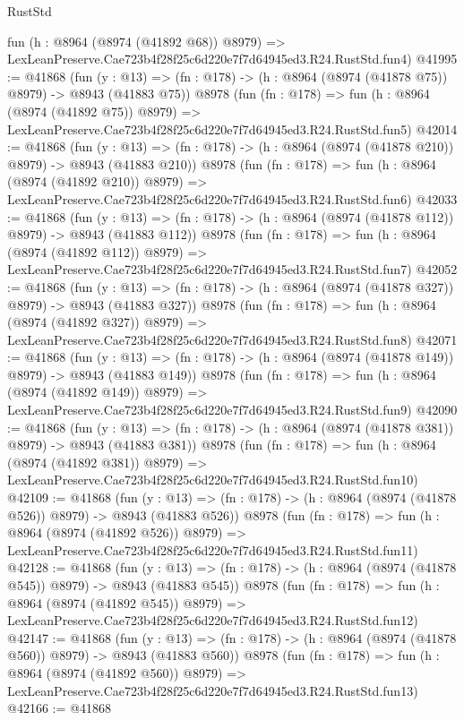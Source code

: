 \begin{lexlean}{RustStd}
\begin{coremodule}
    fun (h : @8964 (@8974 (@41892 @68)) @8979) =>
    LexLeanPreserve.Cae723b4f28f25c6d220e7f7d64945ed3.R24.RustStd.fun4)
@41995 := @41868
    (fun (y : @13) => (fn : @178) -> (h : @8964 (@8974 (@41878 @75)) @8979) -> @8943 (@41883 @75))
    @8978
    (fun (fn : @178) =>
    fun (h : @8964 (@8974 (@41892 @75)) @8979) =>
    LexLeanPreserve.Cae723b4f28f25c6d220e7f7d64945ed3.R24.RustStd.fun5)
@42014 := @41868
    (fun (y : @13) => (fn : @178) -> (h : @8964 (@8974 (@41878 @210)) @8979) -> @8943 (@41883 @210))
    @8978
    (fun (fn : @178) =>
    fun (h : @8964 (@8974 (@41892 @210)) @8979) =>
    LexLeanPreserve.Cae723b4f28f25c6d220e7f7d64945ed3.R24.RustStd.fun6)
@42033 := @41868
    (fun (y : @13) => (fn : @178) -> (h : @8964 (@8974 (@41878 @112)) @8979) -> @8943 (@41883 @112))
    @8978
    (fun (fn : @178) =>
    fun (h : @8964 (@8974 (@41892 @112)) @8979) =>
    LexLeanPreserve.Cae723b4f28f25c6d220e7f7d64945ed3.R24.RustStd.fun7)
@42052 := @41868
    (fun (y : @13) => (fn : @178) -> (h : @8964 (@8974 (@41878 @327)) @8979) -> @8943 (@41883 @327))
    @8978
    (fun (fn : @178) =>
    fun (h : @8964 (@8974 (@41892 @327)) @8979) =>
    LexLeanPreserve.Cae723b4f28f25c6d220e7f7d64945ed3.R24.RustStd.fun8)
@42071 := @41868
    (fun (y : @13) => (fn : @178) -> (h : @8964 (@8974 (@41878 @149)) @8979) -> @8943 (@41883 @149))
    @8978
    (fun (fn : @178) =>
    fun (h : @8964 (@8974 (@41892 @149)) @8979) =>
    LexLeanPreserve.Cae723b4f28f25c6d220e7f7d64945ed3.R24.RustStd.fun9)
@42090 := @41868
    (fun (y : @13) => (fn : @178) -> (h : @8964 (@8974 (@41878 @381)) @8979) -> @8943 (@41883 @381))
    @8978
    (fun (fn : @178) =>
    fun (h : @8964 (@8974 (@41892 @381)) @8979) =>
    LexLeanPreserve.Cae723b4f28f25c6d220e7f7d64945ed3.R24.RustStd.fun10)
@42109 := @41868
    (fun (y : @13) => (fn : @178) -> (h : @8964 (@8974 (@41878 @526)) @8979) -> @8943 (@41883 @526))
    @8978
    (fun (fn : @178) =>
    fun (h : @8964 (@8974 (@41892 @526)) @8979) =>
    LexLeanPreserve.Cae723b4f28f25c6d220e7f7d64945ed3.R24.RustStd.fun11)
@42128 := @41868
    (fun (y : @13) => (fn : @178) -> (h : @8964 (@8974 (@41878 @545)) @8979) -> @8943 (@41883 @545))
    @8978
    (fun (fn : @178) =>
    fun (h : @8964 (@8974 (@41892 @545)) @8979) =>
    LexLeanPreserve.Cae723b4f28f25c6d220e7f7d64945ed3.R24.RustStd.fun12)
@42147 := @41868
    (fun (y : @13) => (fn : @178) -> (h : @8964 (@8974 (@41878 @560)) @8979) -> @8943 (@41883 @560))
    @8978
    (fun (fn : @178) =>
    fun (h : @8964 (@8974 (@41892 @560)) @8979) =>
    LexLeanPreserve.Cae723b4f28f25c6d220e7f7d64945ed3.R24.RustStd.fun13)
@42166 := @41868

\end{coremodule}
\end{lexlean}
